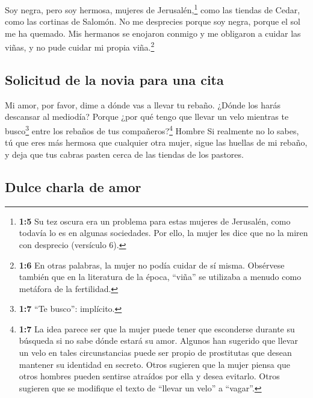  Soy negra, pero soy hermosa, mujeres de
Jerusalén,\footnote{\textbf{1:5} Su tez oscura era un problema para
  estas mujeres de Jerusalén, como todavía lo es en algunas sociedades.
  Por ello, la mujer les dice que no la miren con desprecio (versículo
  6).} como las tiendas de Cedar, como las cortinas de Salomón.
 No me desprecies porque soy negra, porque el sol me ha
quemado. Mis hermanos se enojaron conmigo y me obligaron a cuidar las
viñas, y no pude cuidar mi propia viña.\footnote{\textbf{1:6} En otras
  palabras, la mujer no podía cuidar de sí misma. Obsérvese también que
  en la literatura de la época, ``viña'' se utilizaba a menudo como
  metáfora de la fertilidad.}

\hypertarget{solicitud-de-la-novia-para-una-cita}{%
\subsection{Solicitud de la novia para una
cita}\label{solicitud-de-la-novia-para-una-cita}}

 Mi amor, por favor, dime a dónde vas a llevar tu rebaño.
¿Dónde los harás descansar al mediodía? Porque ¿por qué tengo que llevar
un velo mientras te busco\footnote{\textbf{1:7} ``Te busco'': implícito.}
entre los rebaños de tus compañeros?\footnote{\textbf{1:7} La idea
  parece ser que la mujer puede tener que esconderse durante su búsqueda
  si no sabe dónde estará su amor. Algunos han sugerido que llevar un
  velo en tales circunstancias puede ser propio de prostitutas que
  desean mantener su identidad en secreto. Otros sugieren que la mujer
  piensa que otros hombres pueden sentirse atraídos por ella y desea
  evitarlo. Otros sugieren que se modifique el texto de ``llevar un
  velo'' a ``vagar''.} Hombre  Si realmente no lo sabes,
tú que eres más hermosa que cualquier otra mujer, sigue las huellas de
mi rebaño, y deja que tus cabras pasten cerca de las tiendas de los
pastores.

\hypertarget{dulce-charla-de-amor}{%
\subsection{Dulce charla de amor}\label{dulce-charla-de-amor}}

